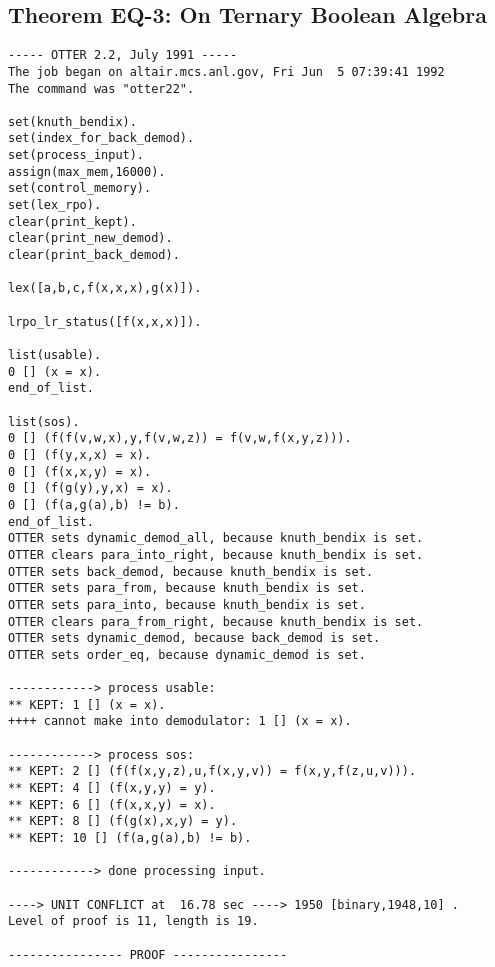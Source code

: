 \subsection{Theorem EQ-3: On Ternary Boolean Algebra}
{\small \begin{verbatim}
----- OTTER 2.2, July 1991 -----
The job began on altair.mcs.anl.gov, Fri Jun  5 07:39:41 1992
The command was "otter22".

set(knuth_bendix).
set(index_for_back_demod).
set(process_input).
assign(max_mem,16000).
set(control_memory).
set(lex_rpo).
clear(print_kept).
clear(print_new_demod).
clear(print_back_demod).

lex([a,b,c,f(x,x,x),g(x)]).

lrpo_lr_status([f(x,x,x)]).

list(usable).
0 [] (x = x).
end_of_list.

list(sos).
0 [] (f(f(v,w,x),y,f(v,w,z)) = f(v,w,f(x,y,z))).
0 [] (f(y,x,x) = x).
0 [] (f(x,x,y) = x).
0 [] (f(g(y),y,x) = x).
0 [] (f(a,g(a),b) != b).
end_of_list.
OTTER sets dynamic_demod_all, because knuth_bendix is set.
OTTER clears para_into_right, because knuth_bendix is set.
OTTER sets back_demod, because knuth_bendix is set.
OTTER sets para_from, because knuth_bendix is set.
OTTER sets para_into, because knuth_bendix is set.
OTTER clears para_from_right, because knuth_bendix is set.
OTTER sets dynamic_demod, because back_demod is set.
OTTER sets order_eq, because dynamic_demod is set.

------------> process usable:
** KEPT: 1 [] (x = x).
++++ cannot make into demodulator: 1 [] (x = x).

------------> process sos:
** KEPT: 2 [] (f(f(x,y,z),u,f(x,y,v)) = f(x,y,f(z,u,v))).
** KEPT: 4 [] (f(x,y,y) = y).
** KEPT: 6 [] (f(x,x,y) = x).
** KEPT: 8 [] (f(g(x),x,y) = y).
** KEPT: 10 [] (f(a,g(a),b) != b).

------------> done processing input.

----> UNIT CONFLICT at  16.78 sec ----> 1950 [binary,1948,10] .
Level of proof is 11, length is 19.

---------------- PROOF ----------------


\end{verbatim}}
